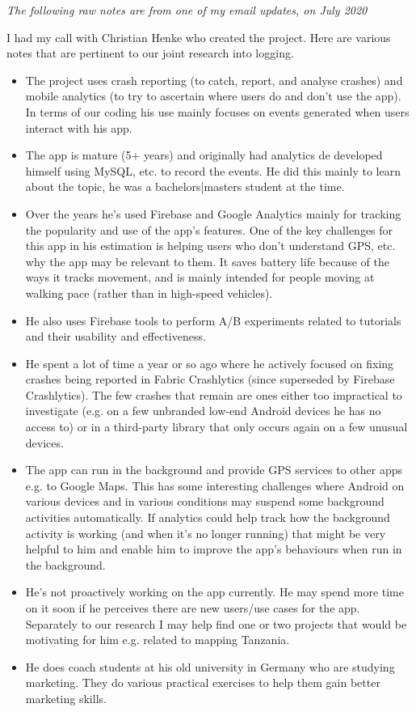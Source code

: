 \textit{The following raw notes are from one of my email updates, on  July 2020}

I had my call with Christian Henke who created the project. Here are various notes that are pertinent to our joint research into logging.
\begin{itemize}

    \item The project uses crash reporting (to catch, report, and analyse crashes) and mobile analytics (to try to ascertain where users do and don't use the app). In terms of our coding his use mainly focuses on events generated when users interact with his app.
    \item The app is mature (5+ years) and originally had analytics de developed himself using MySQL, etc. to record the events. He did this mainly to learn about the topic, he was a bachelors|masters student at the time.
    \item Over the years he's used Firebase and Google Analytics mainly for tracking the popularity and use of the app's features. One of the key challenges for this app in his estimation is helping users who don't understand GPS, etc. why the app may be relevant to them. It saves battery life because of the ways it tracks movement, and is mainly intended for people moving at walking pace (rather than in high-speed vehicles).
    \item He also uses Firebase tools to perform A/B experiments related to tutorials and their usability and effectiveness.
    \item He spent a lot of time a year or so ago where he actively focused on fixing crashes being reported in Fabric Crashlytics (since superseded by Firebase Crashlytics). The few crashes that remain are ones either too impractical to investigate (e.g. on a few unbranded low-end Android devices he has no access to) or in a third-party library that only occurs again on a few unusual devices.
    \item The app can run in the background and provide GPS services to other apps e.g. to Google Maps. This has some interesting challenges where Android on various devices and in various conditions may suspend some background activities automatically. If analytics could help track how the background activity is working (and when it's no longer running) that might be very helpful to him and enable him to improve the app's behaviours when run in the background.
    \item He's not proactively working on the app currently. He may spend more time on it soon if he perceives there are new users/use cases for the app. Separately to our research I may help find one or two projects that would be motivating for him e.g. related to mapping Tanzania.
    \item He does coach students at his old university in Germany who are studying marketing. They do various practical exercises to help them gain better marketing skills.
\end{itemize}


